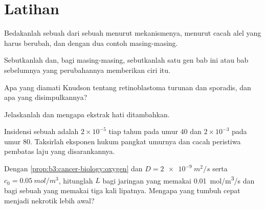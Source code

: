 \section{Latihan}

\begin{exercise}[$\star$]\label{exo:b3:cancer-biology:1}
Bedakanlah sebuah  dari sebuah  menurut mekanismenya,
menurut cacah alel yang harus berubah, dan dengan dua contoh masing-masing.
\end{exercise}

\begin{exercise}[$\star$]\label{exo:b3:cancer-biology:2}
Sebutkanlah  dan, bagi masing-masing, sebutkanlah satu gen bab
ini atau bab sebelumnya yang perubahannya memberikan ciri itu.
\end{exercise}

\begin{exercise}[$\star$]\label{exo:b3:cancer-biology:3}
Apa yang diamati Knudson tentang retinoblastoma turunan dan sporadis,
dan apa yang disimpulkannya?
\end{exercise}

\begin{exercise}[$\star$]\label{exo:b3:cancer-biology:4}
Jelaskanlah  dan mengapa ekstrak hati ditambahkan.
\end{exercise}

\begin{exercise}[$\star\star$]\label{exo:b3:cancer-biology:5}
Insidensi sebuah  adalah $2\times 10^{-5}$ tiap tahun pada umur $40$
dan $2\times 10^{-3}$ pada umur $80$. Taksirlah eksponen hukum pangkat umurnya
dan cacah peristiwa pembatas laju yang disarankannya.
\end{exercise}

\begin{exercise}[$\star\star$]\label{exo:b3:cancer-biology:6}
Dengan \cref{prop:b3:cancer-biology:oxygen} dan $D =
\qty{2e-9}{m^2/s}$ serta $c_{0} = \qty{0.05}{mol/m^3}$, hitunglah $L$ bagi
jaringan yang memakai \qty{0.01}{mol/m^3/s} dan bagi sebuah  yang memakai
tiga kali lipatnya. Mengapa  yang tumbuh cepat menjadi nekrotik lebih awal?
\end{exercise}

